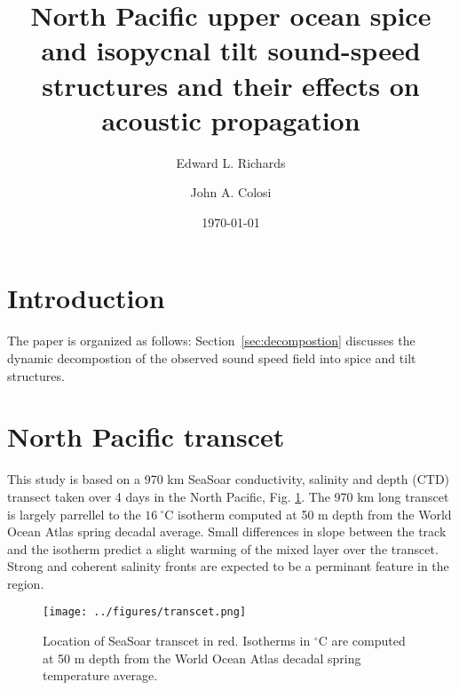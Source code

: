 \documentclass[preprint,NumberedRefs]{JASA}
\begin{document}
\title[Mixed layer tilt and spice]{North Pacific upper ocean spice and isopycnal tilt sound-speed structures and their effects on acoustic propagation}
\author{Edward L. Richards}
\author{John A. Colosi}


\date{\today}


\begin{abstract}

\end{abstract}

\maketitle

\section{\label{sec:intro} Introduction}

The paper is organized as follows: Section~\ref{sec:decompostion} discusses the dynamic decompostion of the observed sound speed field into spice and tilt structures.

\section{North Pacific transcet}
This study is based on a 970 km SeaSoar conductivity, salinity and depth (CTD) transect taken over 4 days in the North Pacific\citep{cole2010seasonal}, Fig. \ref{fig:transcet}. The 970 km long transcet is largely parrellel to the $16 \ ^\circ$C isotherm computed at 50 m depth from the World Ocean Atlas spring decadal average. Small differences in slope between the track and the isotherm predict a slight warming of the mixed layer over the transcet. Strong and coherent salinity fronts are expected to be a perminant feature in the region.

\begin{figure}
\texttt{[image: ../figures/transcet.png]}
    \caption{\label{fig:transcet}{Location of SeaSoar transcet in red. Isotherms in $^\circ$C are computed at 50 m depth from the World Ocean Atlas decadal spring temperature average.}}
\end{figure}
\end{document}

